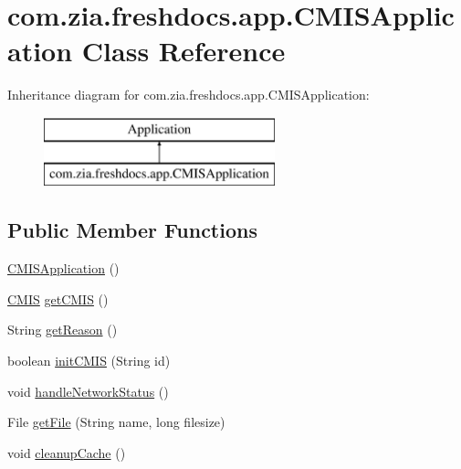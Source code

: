 \hypertarget{classcom_1_1zia_1_1freshdocs_1_1app_1_1_c_m_i_s_application}{\section{com.\-zia.\-freshdocs.\-app.\-C\-M\-I\-S\-Application Class Reference}
\label{classcom_1_1zia_1_1freshdocs_1_1app_1_1_c_m_i_s_application}
}
Inheritance diagram for com.\-zia.\-freshdocs.\-app.\-C\-M\-I\-S\-Application\-:\begin{figure}[H]
\begin{center}
\leavevmode
\includegraphics[height=2.000000cm]{classcom_1_1zia_1_1freshdocs_1_1app_1_1_c_m_i_s_application}
\end{center}
\end{figure}
\subsection*{Public Member Functions}
\begin{DoxyCompactItemize}
\item 
\hyperlink{classcom_1_1zia_1_1freshdocs_1_1app_1_1_c_m_i_s_application_a6cf70b2eef04b260798eef8e9598edf9}{C\-M\-I\-S\-Application} ()
\item 
\hyperlink{classcom_1_1zia_1_1freshdocs_1_1cmis_1_1_c_m_i_s}{C\-M\-I\-S} \hyperlink{classcom_1_1zia_1_1freshdocs_1_1app_1_1_c_m_i_s_application_a4126c3517c31fa3202a7076c6e8f1154}{get\-C\-M\-I\-S} ()
\item 
String \hyperlink{classcom_1_1zia_1_1freshdocs_1_1app_1_1_c_m_i_s_application_ae9b8cae4d7eec12738985b581973b74c}{get\-Reason} ()
\item 
boolean \hyperlink{classcom_1_1zia_1_1freshdocs_1_1app_1_1_c_m_i_s_application_afbb23a439912d5eaef9fbd685eb91801}{init\-C\-M\-I\-S} (String id)
\item 
void \hyperlink{classcom_1_1zia_1_1freshdocs_1_1app_1_1_c_m_i_s_application_a8b6a07d59d3eabffbc8fad3618ed9f20}{handle\-Network\-Status} ()
\item 
File \hyperlink{classcom_1_1zia_1_1freshdocs_1_1app_1_1_c_m_i_s_application_a4997b50446d40f7573c6287a69841011}{get\-File} (String name, long filesize)
\item 
void \hyperlink{classcom_1_1zia_1_1freshdocs_1_1app_1_1_c_m_i_s_application_afe5aa3b8ab033bc9d2f8dd79f3126952}{cleanup\-Cache} ()
\end{DoxyCompactItemize}
